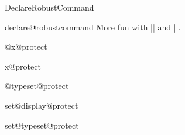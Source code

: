 \begin{docCommand}{DeclareRobustCommand}{}
\begin{docCommand}{declare@robustcommand}{}
    More fun with |\expandafter| and |\csname|.
\begin{teX}
\def\DeclareRobustCommand{\@star@or@long\declare@robustcommand}
\end{teX}
%
\begin{teX}
\def\declare@robustcommand#1{%
   \ifx#1\@undefined\else\ifx#1\relax\else
      \@latex@info{Redefining \string#1}%
   \fi\fi
   \edef\reserved@a{\string#1}%
   \def\reserved@b{#1}%
   \edef\reserved@b{\expandafter\strip@prefix\meaning\reserved@b}%
\end{teX}
\begin{teX}
   \edef#1{%
      \ifx\reserved@a\reserved@b
         \noexpand\x@protect
         \noexpand#1%
      \fi
      \noexpand\protect
      \expandafter\noexpand\csname
         \expandafter\@gobble\string#1 \endcsname
   }%
   \let\@ifdefinable\@rc@ifdefinable
   \expandafter\new@command\csname
      \expandafter\@gobble\string#1 \endcsname
}
\end{teX}
\end{docCommand}
\end{docCommand}
%
%
\begin{docCommand}{@x@protect}{}
\begin{docCommand}{x@protect}{}
%
\end{docCommand}
\end{docCommand}
%
\begin{docCommand}{@typeset@protect}{}
%
\begin{teX}
\let\@typeset@protect\relax
\end{teX}
\end{docCommand}
%
%
\begin{docCommand}{set@display@protect}{}
\begin{docCommand}{set@typeset@protect}{}
\begin{teX}
\def\set@display@protect{\let\protect\string}
\def\set@typeset@protect{\let\protect\@typeset@protect}
\end{teX}
\end{docCommand}
\end{docCommand}
